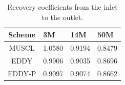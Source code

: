 \begin{table}[t]
\caption{Recovery coefficients from the inlet to the outlet.}
\begin{center}
\label{rc}
\begin{tabular}{c l l l}
\hline
Scheme & 3M     & 14M    & 50M    \\ 
\hline
MUSCL  & 1.0580 & 0.9194 & 0.8479 \\ 
EDDY   & 0.9906 & 0.9035 & 0.8696 \\ 
EDDY-P & 0.9097 & 0.9074 & 0.8662 \\
\hline 
\end{tabular}
\end{center}
\end{table}

























